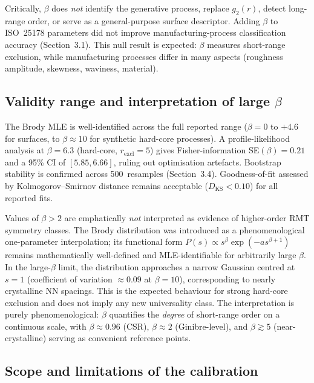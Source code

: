 \documentclass[final,3p,times,twocolumn]{elsarticle}
\theoremstyle{definition}
\begin{document}
Critically, $\beta$ does \emph{not} identify the generative process,
replace $g_2(r)$, detect long-range order, or serve as a
general-purpose surface descriptor. Adding $\beta$ to ISO~25178
parameters did not improve manufacturing-process classification
accuracy (Section~3.1). This null result is expected: $\beta$ measures
short-range exclusion, while manufacturing processes differ in many
aspects (roughness amplitude, skewness, waviness, material).

\subsection{Validity range and interpretation of large $\beta$}

The Brody MLE is well-identified across the full reported range
($\beta=0$ to $+4.6$ for surfaces, to $\beta\approx10$ for synthetic
hard-core processes). A profile-likelihood analysis at $\beta=6.3$
(hard-core, $r_{\text{excl}}=5$) gives Fisher-information
SE$(\beta)=0.21$ and a 95\% CI of $[5.85,6.66]$, ruling out
optimisation artefacts. Bootstrap stability is confirmed across
500~resamples (Section~3.4). Goodness-of-fit assessed by
Kolmogorov--Smirnov distance remains acceptable
($D_{\text{KS}}<0.10$) for all reported fits.

Values of $\beta>2$ are emphatically \emph{not} interpreted as
evidence of higher-order RMT symmetry classes. The Brody distribution
was introduced as a phenomenological one-parameter interpolation; its
functional form $P(s)\propto s^\beta\exp(-as^{\beta+1})$ remains
mathematically well-defined and MLE-identifiable for arbitrarily large
$\beta$. In the large-$\beta$ limit, the distribution approaches a
narrow Gaussian centred at $s=1$ (coefficient of variation
$\approx0.09$ at $\beta=10$), corresponding to nearly crystalline NN
spacings. This is the expected behaviour for strong hard-core exclusion
and does not imply any new universality class. The interpretation is
purely phenomenological: $\beta$ quantifies the \emph{degree} of
short-range order on a continuous scale, with $\beta\approx0.96$
(CSR), $\beta\approx2$ (Ginibre-level), and $\beta\gtrsim5$
(near-crystalline) serving as convenient reference points.

\subsection{Scope and limitations of the calibration}
\end{document}
